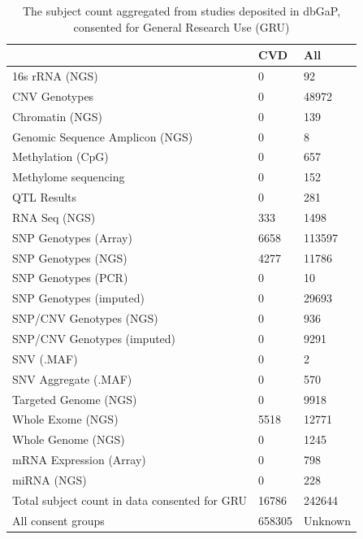 \documentclass[letter]{bioinfo}
\begin{document}
	\begin{table}[]
		\caption{The subject count aggregated from studies deposited in dbGaP, consented for General Research Use (GRU)}
		\label{tab:dbgapSubject}
		\begin{tabular}{l l l}
			\toprule
			& \textbf{CVD} &  \textbf{All}                         \\ \midrule
			16s rRNA (NGS)                 &     0 &      92 \\
			CNV Genotypes                  &     0 &   48972 \\
			Chromatin (NGS)                &     0 &     139 \\
			Genomic Sequence Amplicon (NGS)&     0 &       8 \\
			Methylation (CpG)              &     0 &     657 \\
			Methylome sequencing           &     0 &     152 \\
			QTL Results                    &     0 &     281 \\
			RNA Seq (NGS)                  &   333 &    1498 \\
			SNP Genotypes (Array)          &  6658 &  113597 \\
			SNP Genotypes (NGS)            &  4277 &   11786 \\
			SNP Genotypes (PCR)            &     0 &      10 \\
			SNP Genotypes (imputed)        &     0 &   29693 \\
			SNP/CNV Genotypes (NGS)        &     0 &     936 \\
			SNP/CNV Genotypes (imputed)    &     0 &    9291 \\
			SNV (.MAF)                     &     0 &       2 \\
			SNV Aggregate (.MAF)           &     0 &     570 \\
			Targeted Genome (NGS)          &     0 &    9918 \\
			Whole Exome (NGS)              &  5518 &   12771 \\
			Whole Genome (NGS)             &     0 &    1245 \\
			mRNA Expression (Array)        &     0 &     798 \\
			miRNA (NGS)                        & 0 &   228 \\ \hline
			Total subject count in data consented for GRU & 16786 & 242644 \\ \hline
			All consent groups & 658305 & Unknown \\	
		\end{tabular}
	\end{table}
	
\end{document}
